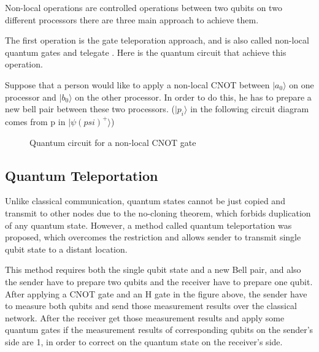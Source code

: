 Non-local operations are controlled operations between two qubits on two different processors there are three main approach to achieve them.

The first operation is the gate teleporation approach, and is also called non-local quantum gates \cite{gateteleportation} and telegate \cite{arithmetic}.  Here is the quantum circuit that achieve this operation.

Suppose that a person would like to apply a non-local CNOT between $|a_0\rangle$ on one processor and $|b_0\rangle$ on the other processor.  In order to do this, he has to prepare a new bell pair between these two processors.  ($|p_i\rangle$ in the following circuit diagram comes from p in $|\psi (psi)^+\rangle$)

 \begin{figure}[ht]
  	\begin{center}
		\caption{Quantum circuit for a non-local CNOT gate}
	\end{center}
\end{figure}

\subsection{Quantum Teleportation}

  Unlike classical communication, quantum states cannot be just copied and transmit to other nodes due to the no-cloning theorem, which forbids duplication of any quantum state.  However, a method called quantum teleportation \cite{teleportation} was proposed, which overcomes the restriction and allows sender to transmit single qubit state to a distant location. 
 		
This method requires both the single qubit state and a new Bell pair, and also the sender have to prepare two qubits and the receiver have to prepare one qubit.  After applying a CNOT gate and an H gate in the figure above, the sender have to measure both qubits and send those measurement results over the classical network.  After the receiver get those measurement results and apply some quantum gates if the measurement results of corresponding qubits on the sender's side are 1, in order to correct on the quantum state on the receiver's side.

